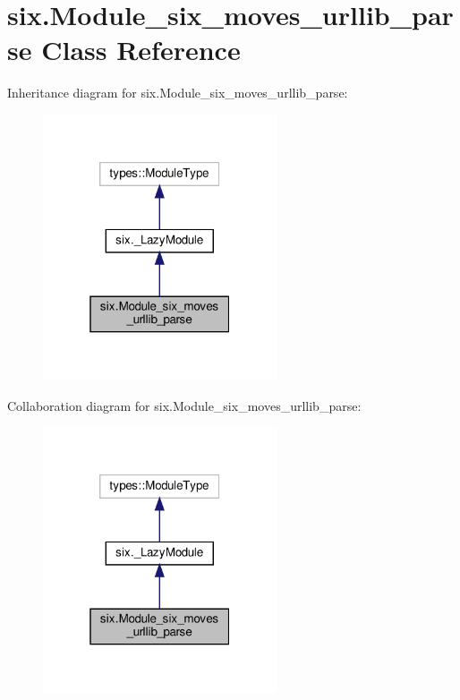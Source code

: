 \hypertarget{classsix_1_1Module__six__moves__urllib__parse}{}\section{six.\+Module\+\_\+six\+\_\+moves\+\_\+urllib\+\_\+parse Class Reference}
\label{classsix_1_1Module__six__moves__urllib__parse}


Inheritance diagram for six.\+Module\+\_\+six\+\_\+moves\+\_\+urllib\+\_\+parse\+:
\nopagebreak
\begin{figure}[H]
\begin{center}
\leavevmode
\includegraphics[width=196pt]{classsix_1_1Module__six__moves__urllib__parse__inherit__graph}
\end{center}
\end{figure}


Collaboration diagram for six.\+Module\+\_\+six\+\_\+moves\+\_\+urllib\+\_\+parse\+:
\nopagebreak
\begin{figure}[H]
\begin{center}
\leavevmode
\includegraphics[width=196pt]{classsix_1_1Module__six__moves__urllib__parse__coll__graph}
\end{center}
\end{figure}
